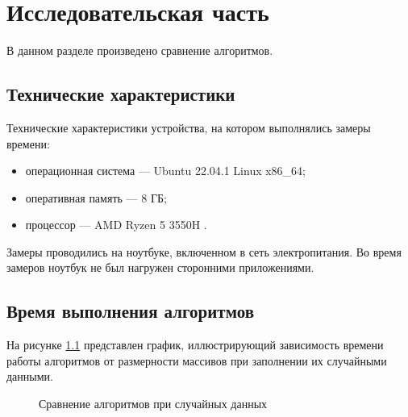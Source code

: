 \chapter{Исследовательская часть}

В данном разделе произведено сравнение  алгоритмов.

\section{Технические характеристики}

Технические характеристики устройства, на котором выполнялись замеры времени:

\begin{itemize}
	\item операционная система --- Ubuntu 22.04.1 Linux x86\_64;
	\item оперативная память --- 8 ГБ;
	\item процессор --- AMD Ryzen 5 3550H \cite{amd}.
\end{itemize}

Замеры проводились на ноутбуке, включенном в сеть электропитания. Во время замеров ноутбук не был нагружен сторонними приложениями.

\section{Время выполнения алгоритмов}

На рисунке \ref{img:g1} представлен график, иллюстрирующий зависимость времени работы алгоритмов от размерности массивов при заполнении их случайными данными.

\begin{figure}[h!]
	\centering
	\caption{Сравнение алгоритмов при случайных данных}
	\label{img:g1}
\end{figure}


